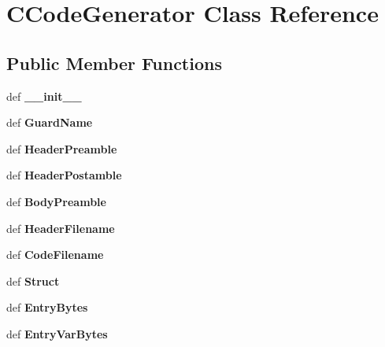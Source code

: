 \section{\-C\-Code\-Generator \-Class \-Reference}
\label{classevent__rpcgen_1_1_c_code_generator}
\subsection*{\-Public \-Member \-Functions}
\begin{DoxyCompactItemize}
\item 
def {\bfseries \-\_\-\-\_\-init\-\_\-\-\_\-}\label{classevent__rpcgen_1_1_c_code_generator_ac775ee34451fdfa742b318538164070e}

\item 
def {\bfseries \-Guard\-Name}\label{classevent__rpcgen_1_1_c_code_generator_a288308bcf9516d8ce55680489b1f01d7}

\item 
def {\bfseries \-Header\-Preamble}\label{classevent__rpcgen_1_1_c_code_generator_a0a4bbdd56f5aea0d9580451648e87d04}

\item 
def {\bfseries \-Header\-Postamble}\label{classevent__rpcgen_1_1_c_code_generator_a2b72ecd060ec6e8b1703f8ed33c01be7}

\item 
def {\bfseries \-Body\-Preamble}\label{classevent__rpcgen_1_1_c_code_generator_a57e1260a81b6a90186f58b23505b15aa}

\item 
def {\bfseries \-Header\-Filename}\label{classevent__rpcgen_1_1_c_code_generator_afb51305c4f4c8a7e6d7e4d80422d3d10}

\item 
def {\bfseries \-Code\-Filename}\label{classevent__rpcgen_1_1_c_code_generator_a033866c7334fbd996c806ab4c0767d8b}

\item 
def {\bfseries \-Struct}\label{classevent__rpcgen_1_1_c_code_generator_a9ab17e22495666ac090176c61da0e2c8}

\item 
def {\bfseries \-Entry\-Bytes}\label{classevent__rpcgen_1_1_c_code_generator_a0c0363babcf64574d908c02c2ad95c15}

\item 
def {\bfseries \-Entry\-Var\-Bytes}\label{classevent__rpcgen_1_1_c_code_generator_a5022f50813eb3b3f99bbeeccaac93e08}


\end{DoxyCompactItemize}
